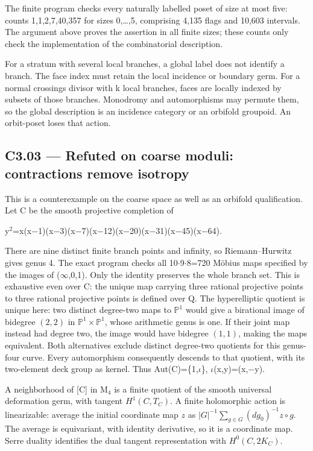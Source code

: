 The finite program checks every naturally labelled poset of size at most five: counts 1,1,2,7,40,357 for sizes 0,\ldots,5, comprising 4,135 flags and 10,603 intervals. The argument above proves the assertion in all finite sizes; these counts only check the implementation of the combinatorial description.

For a stratum with several local branches, a global label does not identify a branch. The face index must retain the local incidence or boundary germ. For a normal crossings divisor with k local branches, faces are locally indexed by subsets of those branches. Monodromy and automorphisms may permute them, so the global description is an incidence category or an orbifold groupoid. An orbit-poset loses that action.

\subsection{C3.03 --- Refuted on coarse moduli: contractions remove isotropy}\label{c3.03-refuted-on-coarse-moduli-contractions-remove-isotropy}

This is a counterexample on the coarse space as well as an orbifold qualification. Let C be the smooth projective completion of

y\ensuremath{{}^{2}}=x(x\ensuremath{-}1)(x\ensuremath{-}3)(x\ensuremath{-}7)(x\ensuremath{-}12)(x\ensuremath{-}20)(x\ensuremath{-}31)(x\ensuremath{-}45)(x\ensuremath{-}64).

There are nine distinct finite branch points and infinity, so Riemann--Hurwitz gives genus 4. The exact program checks all 10\ensuremath{\cdot}9\ensuremath{\cdot}8=720 Möbius maps specified by the images of (\ensuremath{\infty},0,1). Only the identity preserves the whole branch set. This is exhaustive even over C: the unique map carrying three rational projective points to three rational projective points is defined over Q. The hyperelliptic quotient is unique here: two distinct degree-two maps to \(\mathbb P^1\) would give a birational image of bidegree \((2,2)\) in \(\mathbb P^1\times\mathbb P^1\), whose arithmetic genus is one. If their joint map instead had degree two, the image would have bidegree \((1,1)\), making the maps equivalent. Both alternatives exclude distinct degree-two quotients for this genus-four curve. Every automorphism consequently descends to that quotient, with its two-element deck group as kernel. Thus Aut(C)=\{1,\ensuremath{\iota}\}, \ensuremath{\iota}(x,y)=(x,\ensuremath{-}y).

A neighborhood of {[}C{]} in M\ensuremath{{}_{4}} is a finite quotient of the smooth universal deformation germ, with tangent \(H^1(C,T_C)\). A finite holomorphic action is linearizable: average the initial coordinate map \(z\) as \(|G|^{-1}\sum_{g\in G}(dg_0)^{-1}z\circ g\). The average is equivariant, with identity derivative, so it is a coordinate map. Serre duality identifies the dual tangent representation with \(H^0(C,2K_C)\).

